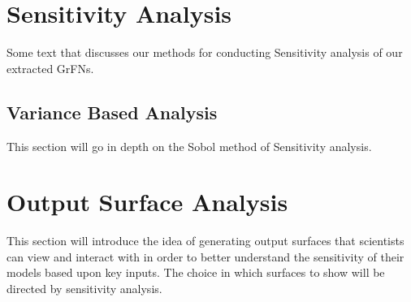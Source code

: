 \section{Sensitivity Analysis\label{sec:sensitivity_overview}}

Some text that discusses our methods for conducting Sensitivity analysis of our extracted GrFNs.

\subsection{Variance Based Analysis\label{sec:sobol_sensitivity}}

This section will go in depth on the Sobol method of Sensitivity analysis.


\section{Output Surface Analysis\label{sec:surface_analysis}}

This section will introduce the idea of generating output surfaces that scientists can view and interact with in order to better understand the sensitivity of their models based upon key inputs. The choice in which surfaces to show will be directed by sensitivity analysis.
